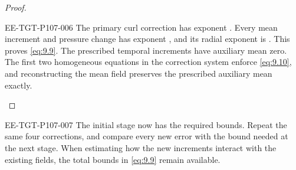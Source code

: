 \begin{proof}
\begin{EESegment}{EE-TGT-P107-006}
The primary curl correction has exponent
. Every mean increment and pressure change has exponent
, and its radial exponent is
. This proves \eqref{eq:9.9}. The prescribed temporal increments
have auxiliary mean zero. The first two homogeneous equations in the correction system enforce
\eqref{eq:9.10}, and reconstructing the mean field preserves the prescribed auxiliary mean
exactly.
\end{EESegment}
\end{proof}

\begin{EESegment}{EE-TGT-P107-007}
The initial stage now has the required bounds. Repeat the same four corrections, and compare every
new error with the bound needed at the next stage. When estimating how the new increments interact
with the existing fields, the total bounds in \eqref{eq:9.9} remain available.
\end{EESegment}

